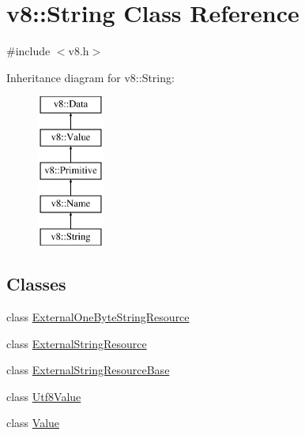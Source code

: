 \hypertarget{classv8_1_1String}{}\section{v8\+:\+:String Class Reference}
\label{classv8_1_1String}


{\ttfamily \#include $<$v8.\+h$>$}

Inheritance diagram for v8\+:\+:String\+:\begin{figure}[H]
\begin{center}
\leavevmode
\includegraphics[height=5.000000cm]{classv8_1_1String}
\end{center}
\end{figure}
\subsection*{Classes}
\begin{DoxyCompactItemize}
\item 
class \mbox{\hyperlink{classv8_1_1String_1_1ExternalOneByteStringResource}{External\+One\+Byte\+String\+Resource}}
\item 
class \mbox{\hyperlink{classv8_1_1String_1_1ExternalStringResource}{External\+String\+Resource}}
\item 
class \mbox{\hyperlink{classv8_1_1String_1_1ExternalStringResourceBase}{External\+String\+Resource\+Base}}
\item 
class \mbox{\hyperlink{classv8_1_1String_1_1Utf8Value}{Utf8\+Value}}
\item 
class \mbox{\hyperlink{classv8_1_1String_1_1Value}{Value}}
\end{DoxyCompactItemize}
